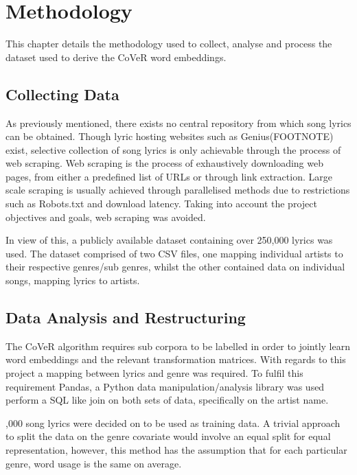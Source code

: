 \chapter{Methodology}
This chapter details the methodology used to collect, analyse and process the dataset used to derive the CoVeR word embeddings.
\label{chap:data_methodology}
\section{Collecting Data}
As previously mentioned, there exists no central repository from which song lyrics can be obtained. Though lyric hosting websites such as Genius(FOOTNOTE) exist, selective collection of song lyrics is only achievable through the process of web scraping. Web scraping is the process of exhaustively downloading web pages, from either a predefined list of URLs or through link extraction. Large scale scraping is usually achieved through parallelised methods due to restrictions such as Robots.txt and download latency. Taking into account the project objectives and goals, web scraping was avoided.

\noindent
\newline
In view of this, a publicly available dataset containing over 250,000 lyrics was used. The dataset comprised of two CSV files, one mapping individual artists to their respective genres/sub genres, whilst the other contained data on individual songs, mapping lyrics to artists. 
\section{Data Analysis and Restructuring}
The CoVeR algorithm requires sub corpora to be labelled in order to jointly learn word embeddings and the relevant transformation matrices. With regards to this project a mapping between lyrics and genre was required. To fulfil this requirement Pandas, a Python data manipulation/analysis library was used  perform a SQL like join on both sets of data, specifically on the artist name.

\noindent
{},000 song lyrics were decided on to be used as training data. A trivial approach to split the data on the genre covariate would involve an equal split for equal representation, however, this method has the assumption that for each particular genre, word usage is the same on average. 

